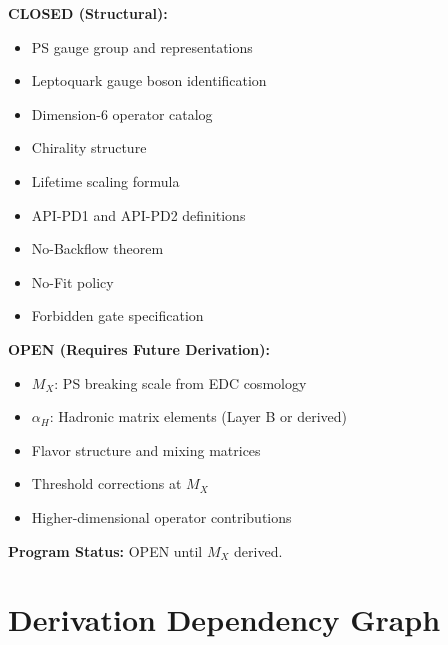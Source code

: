\documentclass[11pt,a4paper]{article}
\theoremstyle{definition}
\begin{document}
\begin{statusbox}
\textbf{CLOSED (Structural):}
\begin{itemize}
  \item[$\checkmark$] PS gauge group and representations
  \item[$\checkmark$] Leptoquark gauge boson identification
  \item[$\checkmark$] Dimension-6 operator catalog
  \item[$\checkmark$] Chirality structure
  \item[$\checkmark$] Lifetime scaling formula
  \item[$\checkmark$] API-PD1 and API-PD2 definitions
  \item[$\checkmark$] No-Backflow theorem
  \item[$\checkmark$] No-Fit policy
  \item[$\checkmark$] Forbidden gate specification
\end{itemize}

\textbf{OPEN (Requires Future Derivation):}
\begin{itemize}
  \item[$\circ$] $M_X$: PS breaking scale from EDC cosmology
  \item[$\circ$] $\alpha_H$: Hadronic matrix elements (Layer B or derived)
  \item[$\circ$] Flavor structure and mixing matrices
  \item[$\circ$] Threshold corrections at $M_X$
  \item[$\circ$] Higher-dimensional operator contributions
\end{itemize}

\textbf{Program Status:} OPEN until $M_X$ derived.
\end{statusbox}

\section{Derivation Dependency Graph}
\label{sec:dag}
\end{document}
